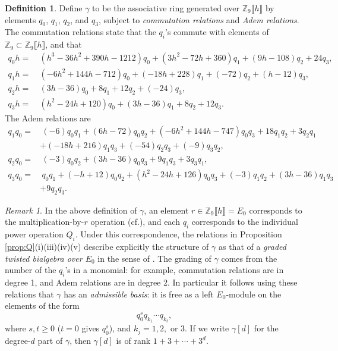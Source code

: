 \documentclass{gtpart}
\theoremstyle{definition}
\newtheorem{defn}[thm]{Definition}
\theoremstyle{remark}
\newtheorem{rmk}[thm]{Remark}
\newcommand{\mb}[1]{\mathbb{#1}}
\newcommand{\cf}{cf.\thinspace}
\newcommand{\BZ}{{\mb Z}}
\newcommand{\g}{\gamma}
\begin{document}
\begin{defn}
\label{def:gamma}
 Define $\g$ to be the associative ring generated over $\BZ_9 \llbracket h \rrbracket$ by elements $q_0$, $q_1$, $q_2$, and $q_3$, 
 subject to {\em commutation relations} and {\em Adem relations}.  
 The commutation relations state that the $q_i$'s commute with elements of $\BZ_9 \subset \BZ_9 \llbracket h \rrbracket$, and that 
 \begin{equation*}
 \begin{split}
  q_0 h = & ~ (h^3 - 36 h^2 + 390 h - 1212) q_0 + (3 h^2 - 72 h + 360) q_1 + (9 h - 108) q_2 + 24 q_3, \\
  q_1 h = & ~ (-6 h^2 + 144 h - 712) q_0 + (-18 h + 228) q_1 + (-72) q_2 + (h - 12) q_3, \\
  q_2 h = & ~ (3 h - 36) q_0 + 8 q_1 + 12 q_2 + (-24) q_3, \\
  q_3 h = & ~ (h^2 - 24 h + 120) q_0 + (3 h - 36) q_1 + 8 q_2 + 12 q_3.  
 \end{split}
 \end{equation*}
 The Adem relations are 
 \begin{equation*}
 \begin{split}
  q_1q_0 = & ~ (-6) q_0q_1 + (6 h - 72) q_0q_2 + (-6 h^2 + 144 h - 747) q_0q_3 + 18 q_1q_2 + 3 q_2q_1 \\
           & + (-18 h + 216) q_1q_3 + (-54) q_2q_3 + (-9) q_3q_2, \\
  q_2q_0 = & ~ (-3) q_0q_2 + (3 h - 36) q_0q_3 + 9 q_1q_3 + 3 q_3q_1, \\
  q_3q_0 = & ~ q_0q_1 + (-h + 12) q_0q_2 + (h^2 - 24 h + 126) q_0q_3 + (-3) q_1q_2 + (3 h - 36) q_1q_3 \\
           & + 9 q_2q_3.  
 \end{split}
 \end{equation*}
\end{defn}

\begin{rmk}
\label{rmk:rank}
 In the above definition of $\g$, an element $r \in \BZ_9 \llbracket h \rrbracket = E_0$ corresponds to the multiplication-by-$r$ operation (\cf \cite[Proposition 6.4]{cong}), 
 and each $q_i$ corresponds to the individual power operation $Q_i$.  
 Under this correspondence, the relations in Proposition \ref{prop:Q}\thinspace (i)(iii)(iv)(v) describe explicitly the structure of $\g$ as 
 that of a {\em graded twisted bialgebra over $E_0$} in the sense of \cite[Section 5]{cong}.  
 The grading of $\g$ comes from the number of the $q_i$'s in a monomial: for example, commutation relations are in degree 1, and Adem relations are in degree 2.  
 In particular it follows using these relations that $\g$ has an {\em admissible basis}: it is free as a left $E_0$-module on the elements of the form 
 \[
  q_0^s q_{k_1} \cdots q_{k_t}, 
 \]
 where $s, t \geq 0$ ($t = 0$ gives $q_0^s$), and $k_j = 1, 2,$ or 3.  
 If we write $\g[d]$ for the degree-$d$ part of $\g$, then $\g[d]$ is of rank $1 + 3 + \cdots + 3^d$.  
\end{rmk}
\end{document}
